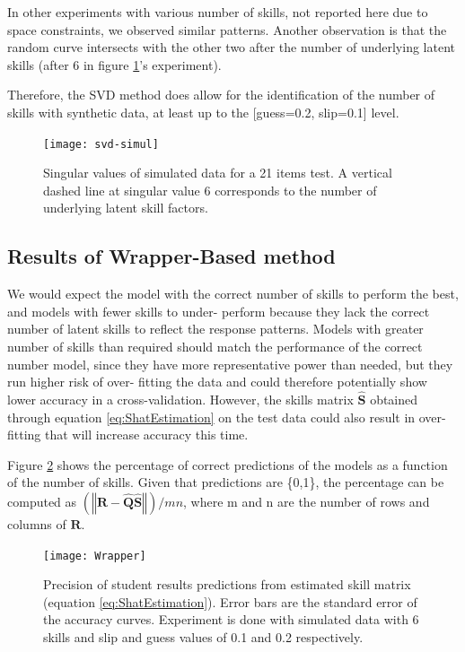 In other experiments with various number of skills, not reported here due to space constraints, we observed similar patterns. Another observation is that the random curve intersects with the other two after the number of underlying latent skills (after 6 in figure \ref{SVD-simul}'s experiment).

Therefore, the SVD method does allow for the identification of the number of skills with synthetic data, at least up to the {[}guess=0.2, slip=0.1{]} level.

\begin{figure}
\centering
\texttt{[image: svd-simul]}\caption{Singular values of simulated data for a 21 items test. A vertical
dashed line at singular value 6 corresponds to the number of underlying
latent skill factors.}
\label{SVD-simul}

\end{figure}

\subsection{Results of Wrapper-Based method}


We would expect the model with the correct number of skills to perform the best, and models with fewer skills to under- perform because they lack the correct number of latent skills to reflect the response patterns. Models with greater number of skills than required should match the performance of the correct number model, since they have more representative power than needed, but they run higher risk of over- fitting the data and could therefore potentially show lower accuracy in a cross-validation. However, the skills matrix $\hat{\mathbf{S}}$ obtained through equation \ref{eq:ShatEstimation} on the test data could also result in over-fitting that will increase accuracy this time.

Figure \ref{Wrapper} shows the percentage of correct predictions of the models as a function of the number of skills. Given that predictions are \{0,1\}, the percentage can be computed as $\left(\left\Vert \mathbf{R}-\hat{\mathbf{Q}}\hat{\mathbf{S}}\right\Vert \right)/mn$, where m and n are the number of rows and columns of $\mathbf{R}$.

\begin{figure}
\centering

\texttt{[image: Wrapper]}\caption{Precision of student results predictions from estimated skill matrix
(equation \ref{eq:ShatEstimation}). Error bars are the standard error
of the accuracy curves. Experiment is done with simulated data with
6 skills and slip and guess values of 0.1 and 0.2 respectively.}
\label{Wrapper}
\end{figure}



